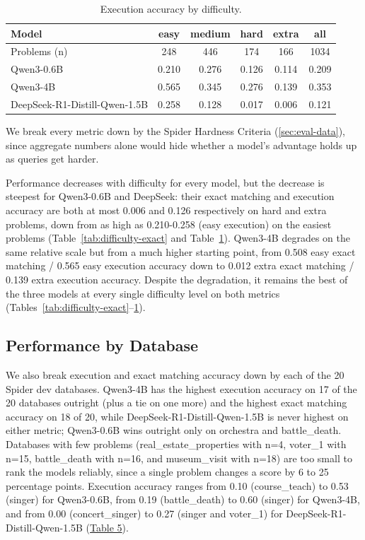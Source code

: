 \begin{table}[H]
\centering
\footnotesize
\caption{Execution accuracy by difficulty.}
\label{tab:difficulty-execution}
\begin{tabular}{lccccc}
\toprule
Model & easy & medium & hard & extra & all \\
\midrule
Problems (n) & 248 & 446 & 174 & 166 & 1034 \\
Qwen3-0.6B & 0.210 & 0.276 & 0.126 & 0.114 & 0.209 \\
Qwen3-4B & 0.565 & 0.345 & 0.276 & 0.139 & 0.353 \\
DeepSeek-R1-Distill-Qwen-1.5B & 0.258 & 0.128 & 0.017 & 0.006 & 0.121 \\
\bottomrule
\end{tabular}
\end{table}

We break every metric down by the Spider Hardness Criteria (\ref{sec:eval-data}), since aggregate numbers alone would hide whether a model's advantage holds up as queries get harder.

Performance decreases with difficulty for every model, but the decrease is steepest for Qwen3-0.6B and DeepSeek: their exact matching and execution accuracy are both at most 0.006 and 0.126 respectively on hard and extra problems, down from as high as 0.210-0.258 (easy execution) on the easiest problems (Table~\ref{tab:difficulty-exact} and Table~\ref{tab:difficulty-execution}). Qwen3-4B degrades on the same relative scale but from a much higher starting point, from 0.508 easy exact matching / 0.565 easy execution accuracy down to 0.012 extra exact matching / 0.139 extra execution accuracy. Despite the degradation, it remains the best of the three models at every single difficulty level on both metrics (Tables~\ref{tab:difficulty-exact}--\ref{tab:difficulty-execution}).

\subsection{Performance by Database}
\label{sec:by-database}

We also break execution and exact matching accuracy down by each of the 20 Spider dev databases. Qwen3-4B has the highest execution accuracy on 17 of the 20 databases outright (plus a tie on one more) and the highest exact matching accuracy on 18 of 20, while DeepSeek-R1-Distill-Qwen-1.5B is never highest on either metric; Qwen3-0.6B wins outright only on orchestra and battle\_death. Databases with few problems (real\_estate\_properties with n=4, voter\_1 with n=15, battle\_death with n=16, and museum\_visit with n=18) are too small to rank the models reliably, since a single problem changes a score by 6 to 25 percentage points. Execution accuracy ranges from 0.10 (course\_teach) to 0.53 (singer) for Qwen3-0.6B, from 0.19 (battle\_death) to 0.60 (singer) for Qwen3-4B, and from 0.00 (concert\_singer) to 0.27 (singer and voter\_1) for DeepSeek-R1-Distill-Qwen-1.5B (\hyperref[tab:exec-acc-rq1-by-database]{Table 5}). 


